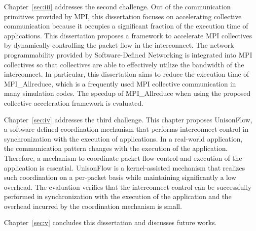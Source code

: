 Chapter~\ref{sec:iii} addresses the second challenge. Out of the communication
primitives provided by MPI, this dissertation focuses on accelerating
collective communication because it occupies a significant fraction of the
execution time of applications. This dissertation proposes a framework to
accelerate MPI collectives by dynamically controlling the packet flow in the
interconnect. The network programmability provided by Software-Defined
Networking is integrated into MPI collectives so that collectives are able to
effectively utilize the bandwidth of the interconnect. In particular, this
dissertation aims to reduce the execution time of MPI\_Allreduce, which is a
frequently used MPI collective communication in many simulation codes. The
speedup of MPI\_Allreduce when using the proposed collective acceleration
framework is evaluated.

Chapter~\ref{sec:iv} addresses the third challenge. This chapter proposes
UnisonFlow, a software-defined coordination mechanism that performs
interconnect control in synchronization with the execution of applications.
In a real-world application, the communication pattern changes with the
execution of the application. Therefore, a mechanism to coordinate packet flow
control and execution of the application is essential. UnisonFlow is a
kernel-assisted mechanism that realizes such coordination on a per-packet
basis while maintaining significantly a low overhead. The evaluation verifies
that the interconnect control can be successfully performed in synchronization
with the execution of the application and the overhead incurred by the
coordination mechanism is small.

Chapter~\ref{sec:v} concludes this dissertation and discusses future works.

